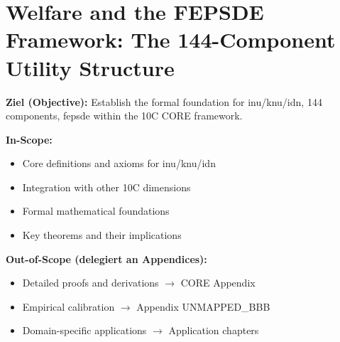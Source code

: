 %
%
%
%

\chapter{Welfare and the FEPSDE Framework: The 144-Component Utility Structure}
\label{ch:welfare-fepsde}

\begin{tcolorbox}[
    colback=purple!5!white,
    colframe=purple!75!black,
    title={\textbf{Chapter Scope: Ziel / In-Scope / Out-of-Scope}},
    fonttitle=\bfseries
]

\textbf{Ziel (Objective):}
Establish the formal foundation for inu/knu/idn, 144 components, fepsde within the 10C CORE framework.

\vspace{0.3cm}
\textbf{In-Scope:}
\begin{itemize}[nosep]
    \item Core definitions and axioms for inu/knu/idn
    \item Integration with other 10C dimensions
    \item Formal mathematical foundations
    \item Key theorems and their implications
\end{itemize}

\vspace{0.3cm}
\textbf{Out-of-Scope (delegiert an Appendices):}
\begin{itemize}[nosep]
    \item Detailed proofs and derivations $\rightarrow$ CORE Appendix
    \item Empirical calibration $\rightarrow$ Appendix UNMAPPED_BBB
    \item Domain-specific applications $\rightarrow$ Application chapters
\end{itemize}

\end{tcolorbox}



